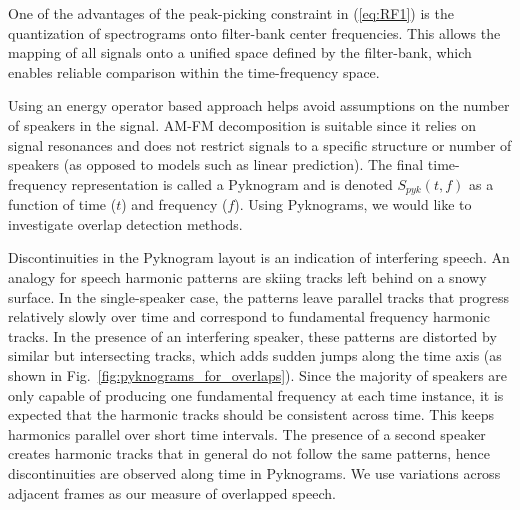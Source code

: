 {One of the advantages of the peak-picking constraint in (\ref{eq:RF1}) is the quantization of spectrograms onto filter-bank center frequencies. 
This allows the mapping of all signals onto a unified space defined by the filter-bank, which enables reliable comparison within the time-frequency space. 

Using an energy operator based approach helps avoid assumptions on the number of speakers in the signal. 
AM-FM decomposition is suitable since it relies on signal resonances and does not restrict signals to a specific structure or number of speakers (as opposed to models such as linear prediction). 
The final time-frequency representation is called a Pyknogram and is denoted $S_{pyk}(t,f)$ as a function of time ($t$) and frequency ($f$). 
Using Pyknograms, we would like to investigate overlap detection methods.

Discontinuities in the Pyknogram layout is an indication of interfering speech. 
An analogy for speech harmonic patterns are skiing tracks left behind on a snowy surface. 
In the single-speaker case, the patterns leave parallel tracks that progress relatively slowly over time and correspond to fundamental frequency harmonic tracks. 
In the presence of an interfering speaker, these patterns are distorted by similar but intersecting tracks, which adds sudden jumps along the time axis (as shown in Fig.~\ref{fig:pyknograms_for_overlaps}). 
Since the majority of speakers are only capable of producing one fundamental frequency at each time instance, it is expected that the harmonic tracks should be consistent across time. 
This keeps harmonics parallel over short time intervals.   
The presence of a second speaker creates harmonic tracks that in general do not follow the same patterns, hence discontinuities are observed along time in Pyknograms. We use variations across adjacent frames as our measure of overlapped speech.

}
